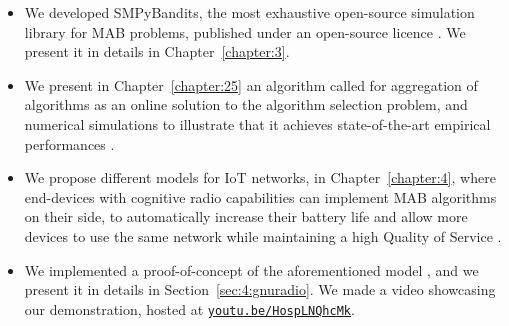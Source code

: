 \begin{itemize}


    \item
    We developed SMPyBandits, the most exhaustive open-source simulation library for MAB problems, published under an open-source licence \cite{SMPyBandits,SMPyBanditsJMLR}.
    We present it in details in Chapter~\ref{chapter:3}.

    \item
    We present in Chapter~\ref{chapter:25} an algorithm called \Aggr{} for aggregation of algorithms as an online solution to the algorithm selection problem, and numerical simulations to illustrate that it achieves state-of-the-art empirical performances
    \cite{Besson2018WCNC}.

    \item
    We propose different models for IoT networks, in Chapter~\ref{chapter:4}, where end-devices with cognitive radio capabilities can implement MAB algorithms on their side, to automatically increase their battery life and allow more devices to use the same network while maintaining a high Quality of Service
    \cite{Bonnefoi17,Besson2019WCNC,Bonnefoi2019WCNC}.

    \item
    We implemented a proof-of-concept of the aforementioned model \cite{Besson2018ICT}, and we present it in details in Section~\ref{sec:4:gnuradio}. We made a video showcasing our demonstration, hosted at \texttt{\href{https://youtu.be/HospLNQhcMk}{youtu.be/HospLNQhcMk}}.



\end{itemize}
